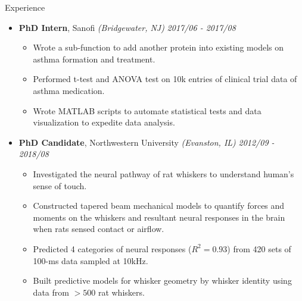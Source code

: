 \documentclass{resume} %
\begin{document}
\begin{rSection}{Experience}
\begin{itemize}
	\item {\bf PhD Intern}{, Sanofi \textit{(Bridgewater, NJ)}} \hfill {\em 2017/06 - 2017/08}\\
	\vspace{-5mm}
	\begin{itemize}
		\setlength\itemsep{-1.75em}	
		\item Wrote a sub-function to add another protein into existing models on asthma formation and treatment.\\
		\item Performed t-test and ANOVA test on 10k entries of clinical trial data of asthma medication.\\ 
		\item Wrote MATLAB scripts to automate statistical tests and data visualization to expedite data analysis.
	\end{itemize}

	\item {\bf PhD Candidate}{, Northwestern University \textit{(Evanston, IL)}} \hfill {\em 2012/09 - 2018/08}\\
	\vspace{-5mm}
	\begin{itemize}
		\setlength\itemsep{-1.75em}
		\item Investigated the neural pathway of rat whiskers to understand human's sense of touch.\\
		\item Constructed tapered beam mechanical models to quantify forces and moments on the whiskers and resultant neural responses in the brain when rats sensed contact or airflow.\\
		\item Predicted 4 categories of neural responses ($R^2=0.93$) from 420 sets of 100-ms data sampled at 10kHz.\\
		\item Built predictive models for whisker geometry by whisker identity using data from $>500$ rat whiskers.	
	\end{itemize}

	
	\end{itemize}

\end{rSection}
\end{document}

